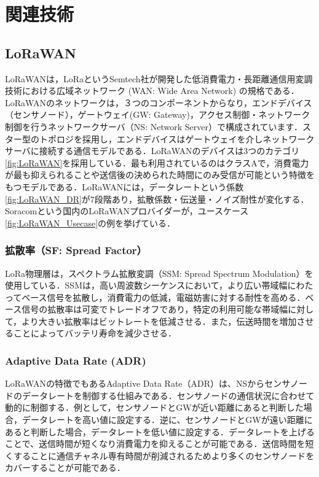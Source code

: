 \chapter{関連技術}

\section{LoRaWAN}
LoRaWANは，LoRaというSemtech社が開発した低消費電力・長距離通信用変調技術における広域ネットワーク (WAN: Wide Area Network) の規格である．LoRaWANのネットワークは，３つのコンポーネントからなり，エンドデバイス（センサノード），ゲートウェイ(GW: Gateway)，アクセス制御・ネットワーク制御を行うネットワークサーバ（NS: Network Server）で構成されています．スター型のトポロジを採用し，エンドデバイスはゲートウェイを介しネットワークサーバに接続する通信モデルである．LoRaWANのデバイスは3つのカテゴリ\ref{fig:LoRaWAN}を採用している．最も利用されているのはクラスAで，消費電力が最も抑えられることや送信後の決められた時間にのみ受信が可能という特徴をもつモデルである．LoRaWANには，データレートという係数\ref{fig:LoRaWAN_DR}が7段階あり，拡散係数・伝送量・ノイズ耐性が変化する．Soracomという国内のLoRaWANプロバイダーが，ユースケース\ref{fig:LoRaWAN_Usecase}の例を挙げている．

\subsection{拡散率（SF: Spread Factor）}
LoRa物理層は，スペクトラム拡散変調（SSM: Spread Spectrum Modulation）を使用している．SSMは，高い周波数シーケンスにおいて，より広い帯域幅にわたってベース信号を拡散し，消費電力の低減，電磁妨害に対する耐性を高める．ベース信号の拡散率は可変でトレードオフであり，特定の利用可能な帯域幅に対して，より大きい拡散率はビットレートを低減させる．また，伝送時間を増加させることによってバッテリ寿命を減少させる．

\subsection{Adaptive Data Rate (ADR)}
LoRaWANの特徴でもあるAdaptive Data Rate（ADR）は、NSからセンサノードのデータレートを制御する仕組みである．センサノードの通信状況に合わせて動的に制御する．例として，センサノードとGWが近い距離にあると判断した場合，データレートを高い値に設定する．逆に、センサノードとGWが遠い距離にあると判断した場合，データレートを低い値に設定する．データレートを上げることで、送信時間が短くなり消費電力を抑えることが可能である．送信時間を短くすることに通信チャネル専有時間が削減されるためより多くのセンサノードをカバーすることが可能である．

